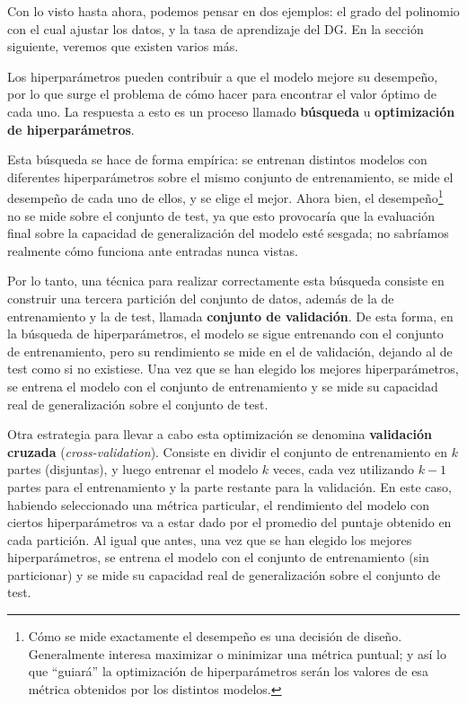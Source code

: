 \documentclass[../../main.tex]{subfiles}
\begin{document}
Con lo visto hasta ahora, podemos pensar en dos ejemplos: el grado del polinomio con el
cual ajustar los datos, y la tasa de aprendizaje del DG. En la sección siguiente, veremos
que existen varios más.

Los hiperparámetros pueden contribuir a que el modelo mejore su desempeño, por lo que
surge el problema de cómo hacer para encontrar el valor óptimo de cada uno. La respuesta a
esto es un proceso llamado \textbf{búsqueda} u \textbf{optimización de hiperparámetros}.

Esta búsqueda se hace de forma empírica: se entrenan distintos modelos con diferentes
hiperparámetros sobre el mismo conjunto de entrenamiento, se mide el desempeño de cada uno
de ellos, y se elige el mejor. Ahora bien, el desempeño\footnote{Cómo se mide
exactamente el desempeño es una decisión de diseño. Generalmente interesa maximizar o
minimizar una métrica puntual; y así lo que ``guiará'' la optimización de hiperparámetros
serán los valores de esa métrica obtenidos por los distintos modelos.} no se mide sobre el
conjunto de test, ya que esto provocaría que la evaluación final sobre la capacidad de
generalización del modelo esté sesgada; no sabríamos realmente cómo funciona ante entradas
nunca vistas.

Por lo tanto, una técnica para realizar correctamente esta búsqueda consiste en construir
una tercera partición del conjunto de datos, además de la de entrenamiento y la de test,
llamada \textbf{conjunto de validación}. De esta forma, en la búsqueda de hiperparámetros,
el modelo se sigue entrenando con el conjunto de entrenamiento, pero su rendimiento se
mide en el de validación, dejando al de test como si no existiese. Una vez que se han
elegido los mejores hiperparámetros, se entrena el modelo con el conjunto de entrenamiento
y se mide su capacidad real de generalización sobre el conjunto de test.

Otra estrategia para llevar a cabo esta optimización se denomina \textbf{validación
cruzada} (\textit{cross-validation}). Consiste en dividir el conjunto de entrenamiento en
\(k\) partes (disjuntas), y luego entrenar el modelo \(k\) veces, cada vez utilizando
\(k-1\) partes para el entrenamiento y la parte restante para la validación. En este caso,
habiendo seleccionado una métrica particular, el rendimiento del modelo con ciertos
hiperparámetros va a estar dado por el promedio del puntaje obtenido en cada partición. Al
igual que antes, una vez que se han elegido los mejores hiperparámetros, se entrena el
modelo con el conjunto de entrenamiento (sin particionar) y se mide su capacidad real de
generalización sobre el conjunto de test.
\end{document}
